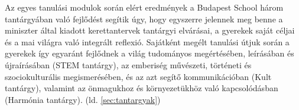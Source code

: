 Az egyes
tanulási modulok során elért eredmények a Budapest School három tantárgyában
való fejlődést segítik úgy, hogy egyszerre jelennek meg benne a miniszter által
kiadott kerettantervek tantárgyi elvárásai, a gyerekek saját céljai és a mai
világra való integrált reflexió. Sajátként megélt tanulási útjuk során a
gyerekek így egyaránt fejlődnek a világ tudományos megértésében, leírásában és
újraírásában (STEM tantárgy), az emberiség művészeti, történeti és
szociokulturális
megismerésében, és az azt segítő kommunikációban (Kult tantárgy), valamint az
önmagukhoz
és környezetükhöz való kapcsolódásban (Harmónia tantárgy). (ld.
\ref{sec:tantargyak})




\ifkerettanterv
  
\fi
